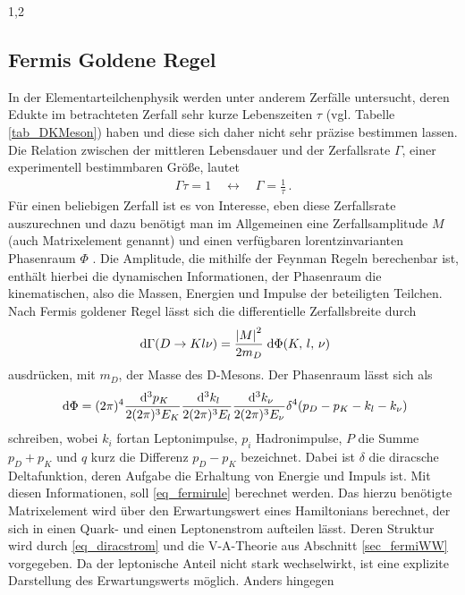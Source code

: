 \documentclass[11pt,a4paper,twoside]{report}
\begin{document}
\begin{spacing}{1,2}
\subsection{Fermis Goldene Regel}
\label{sec_fermigoldenrule}
In der Elementarteilchenphysik werden unter anderem Zerfälle untersucht, deren Edukte im betrachteten Zerfall sehr kurze Lebenszeiten $\tau$ (vgl. Tabelle \ref{tab_DKMeson}) haben 
und diese sich daher nicht sehr präzise bestimmen lassen. Die Relation zwischen der mittleren Lebensdauer und der Zerfallsrate $\Gamma$, einer experimentell 
bestimmbaren Größe, lautet
\begin{align}
 \Gamma \tau = 1 \quad \leftrightarrow\quad  \Gamma = \frac{1}{\tau}\,.
\end{align} 
Für einen beliebigen Zerfall ist es von Interesse, eben diese Zerfallsrate auszurechnen und dazu
benötigt man im Allgemeinen eine Zerfallsamplitude $M$ (auch Matrixelement genannt) und einen verfügbaren lorentzinvarianten Phasenraum $\Phi$ 
\cite{TeilFortgeschr}\cite{Griffiths}. Die Amplitude,
die mithilfe der Feynman Regeln berechenbar ist, enthält hierbei die dynamischen Informationen, der Phasenraum die kinematischen, also die Massen, Energien
und Impulse der beteiligten Teilchen. Nach Fermis goldener Regel lässt sich die differentielle Zerfallsbreite durch
\begin{align}
 \; \mathrm{d} \Gamma(D \rightarrow K l \nu) = \frac{\left|M\right|^2}{2m_D}\; \mathrm{d} \Phi(K, \,l,\, \nu)
 \label{eq_fermirule}
\end{align}
ausdrücken, mit $m_D$, der Masse des D-Mesons. Der Phasenraum lässt sich als
\begin{align}
 \; \mathrm{d} \Phi = (2\pi)^4 \frac{\; \mathrm{d}^3p_K}{2(2\pi)^3E_K}\frac{\; \mathrm{d}^3k_l}{2(2\pi)^3E_l}\frac{\; \mathrm{d}^3k_\nu}{2(2\pi)^3E_\nu}\delta^4(p_D-p_K-k_l-k_\nu)
\end{align}
schreiben, wobei $k_i$ fortan Leptonimpulse, $p_i$ Hadronimpulse, $P$ die Summe $p_D+p_K$ und $q$ kurz die Differenz $p_D - p_K$ bezeichnet. 
Dabei ist $\delta$ die diracsche Deltafunktion, deren Aufgabe die Erhaltung von Energie und Impuls ist. Mit diesen Informationen, soll \eqref{eq_fermirule}
berechnet werden. Das hierzu benötigte Matrixelement wird über den Erwartungswert eines Hamiltonians berechnet,
der sich in einen Quark- und einen Leptonenstrom aufteilen lässt. Deren Struktur wird durch \eqref{eq_diracstrom} und die V-A-Theorie aus Abschnitt 
\ref{sec_fermiWW} vorgegeben. Da der leptonische Anteil nicht stark wechselwirkt, ist eine explizite Darstellung des Erwartungswerts möglich. Anders hingegen

\end{spacing}
\end{document}
